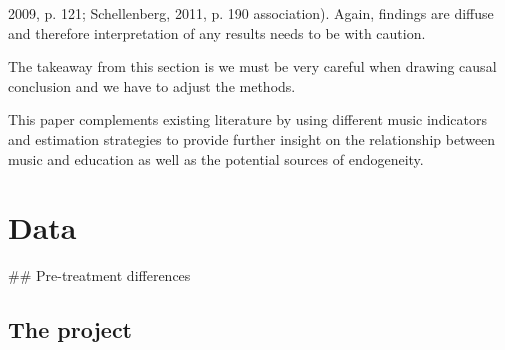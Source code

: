 \documentclass[a4, 12pt]{article}
\begin{document}
2009, p. 121; Schellenberg, 2011, p. 190 association). Again, findings are diffuse and therefore interpretation of any results needs to be with caution.

The takeaway from this section is we must be very careful when drawing causal conclusion and we have to adjust the methods.

This paper complements existing literature by using different music indicators and estimation strategies to provide further insight on the relationship between music and education as well as the potential sources of endogeneity.

\clearpage

\hypertarget{data}{%
\section{Data}\label{data}}

\label{sec:data}
\#\# Pre-treatment differences

\hypertarget{the-project}{%
\subsection{The project}\label{the-project}}
\end{document}
